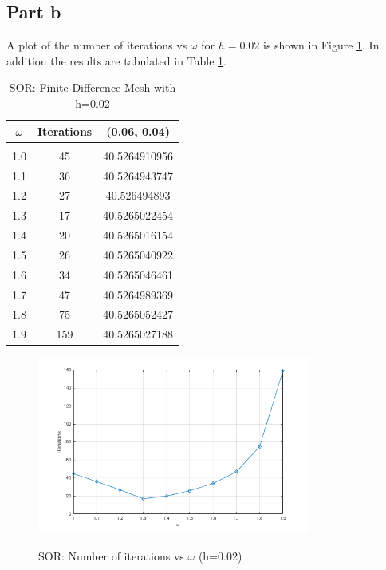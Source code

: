 \documentclass[11pt]{amsart}
\begin{document}
\subsection*{Part b}
A plot of the number of iterations vs $\omega$ for $h=0.02$ is shown in Figure \ref{fig:itr_vs_omega}. In addition the results are tabulated in Table \ref{tbl:fdm_mesh_1}.

\begin{table}[h!]
    \caption{SOR: Finite Difference Mesh with h=0.02}
    \label{tbl:fdm_mesh_1}
    \begin{tabular}{ c | c | c}
    	\textbf{$\omega$} & \textbf{Iterations} & \textbf{(0.06, 0.04)}\\ \hline \\
	1.0 & 45 & 40.5264910956\\
	1.1 & 36 & 40.5264943747\\
	1.2 & 27 & 40.526494893\\
	1.3 & 17 & 40.5265022454\\
	1.4 & 20 & 40.5265016154\\
	1.5 & 26 & 40.5265040922\\
	1.6 & 34 & 40.5265046461\\
	1.7 & 47 & 40.5264989369\\
	1.8 & 75 & 40.5265052427\\
	1.9 & 159 & 40.5265027188
    \end{tabular}
\end{table}
\begin{center}
	\begin{figure}[h]
		\caption{SOR: Number of iterations vs $\omega$ (h=0.02)}
		\includegraphics[width=0.8\textwidth]{assets/itr_vs_omega.png}\label{fig:itr_vs_omega}
	\end{figure}
\end{center}
\end{document}
